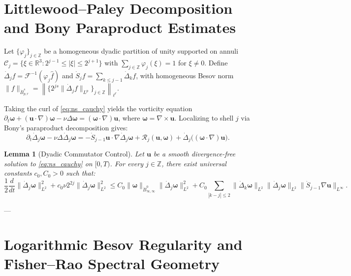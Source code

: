 \documentclass[11pt,a4paper]{article}
\newtheorem{lemma}[theorem]{Lemma}
\theoremstyle{definition}
\theoremstyle{remark}
\begin{document}
\section{Littlewood--Paley Decomposition and Bony Paraproduct Estimates}

Let $\{\varphi_j\}_{j \in \mathbb{Z}}$ be a homogeneous dyadic partition of unity supported on annuli $\mathcal{C}_j = \{\xi \in \mathbb{R}^3 : 2^{j-1} \le |\xi| \le 2^{j+1}\}$ with $\sum_{j \in \mathbb{Z}} \varphi_j(\xi) = 1$ for $\xi \neq 0$. Define $\dot{\Delta}_j f = \mathcal{F}^{-1}(\varphi_j \hat{f})$ and $\dot{S}_j f = \sum_{k \le j-1} \dot{\Delta}_k f$, with homogeneous Besov norm $\|f\|_{\dot{B}^s_{p,r}} = \left\| \{2^{js} \|\dot{\Delta}_j f\|_{L^p}\}_{j \in \mathbb{Z}} \right\|_{\ell^r}$.

Taking the curl of \eqref{eq:ns_cauchy} yields the vorticity equation $\partial_t \boldsymbol{\omega} + (\mathbf{u} \cdot \nabla)\boldsymbol{\omega} - \nu \Delta \boldsymbol{\omega} = (\boldsymbol{\omega} \cdot \nabla)\mathbf{u}$, where $\boldsymbol{\omega} = \nabla \times \mathbf{u}$. Localizing to shell $j$ via Bony's paraproduct decomposition gives:
\begin{equation}
\partial_t \dot{\Delta}_j \boldsymbol{\omega} - \nu \Delta \dot{\Delta}_j \boldsymbol{\omega} = -\dot{S}_{j-1}\mathbf{u} \cdot \nabla \dot{\Delta}_j \boldsymbol{\omega} + \mathcal{R}_j(\mathbf{u}, \boldsymbol{\omega}) + \dot{\Delta}_j\big((\boldsymbol{\omega} \cdot \nabla)\mathbf{u}\big).
\end{equation}

\begin{lemma}[Dyadic Commutator Control]
\label{lem:bony_bound}
Let $\mathbf{u}$ be a smooth divergence-free solution to \eqref{eq:ns_cauchy} on $[0, T)$. For every $j \in \mathbb{Z}$, there exist universal constants $c_0, C_0 > 0$ such that:
\begin{equation}
\frac{1}{2}\frac{d}{dt}\|\dot{\Delta}_j \boldsymbol{\omega}\|_{L^2}^2 + c_0 \nu 2^{2j} \|\dot{\Delta}_j \boldsymbol{\omega}\|_{L^2}^2 \le C_0 \|\boldsymbol{\omega}\|_{\dot{B}^0_{\infty, \infty}} \|\dot{\Delta}_j \boldsymbol{\omega}\|_{L^2}^2 + C_0 \sum_{|k-j| \le 2} \|\dot{\Delta}_k \boldsymbol{\omega}\|_{L^2} \|\dot{\Delta}_j \boldsymbol{\omega}\|_{L^2} \|\dot{S}_{j-1}\nabla \mathbf{u}\|_{L^\infty}.
\end{equation}
\end{lemma}

---

\section{Logarithmic Besov Regularity and Fisher--Rao Spectral Geometry}
\end{document}
